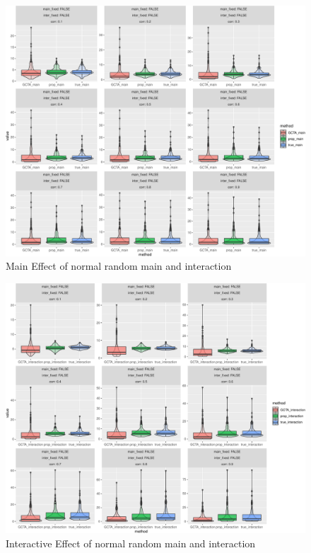 \documentclass[]{article}
\begin{document}
\begin{figure}
\centering
\includegraphics{Simulation_report_files/figure-latex/main_random_random_normal-1.pdf}
\caption{Main Effect of normal random main and interaction}
\end{figure}

\begin{figure}
\centering
\includegraphics{Simulation_report_files/figure-latex/inter_random_random_normal-1.pdf}
\caption{Interactive Effect of normal random main and interaction}
\end{figure}
\end{document}
